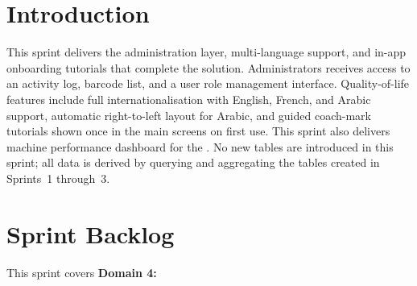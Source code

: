 \section*{Introduction}

This sprint delivers the administration layer, multi-language support, and
in-app onboarding tutorials that complete the  solution.
Administrators receives access to an activity log, barcode list, and a user role management
interface. Quality-of-life features include full internationalisation with English,
French, and Arabic support, automatic right-to-left layout for Arabic, and guided 
coach-mark tutorials shown once in the main screens on first use. This sprint also 
delivers machine performance dashboard for the . No new
 tables are introduced in this sprint; all data is
derived by querying and aggregating the tables created in Sprints~1 through~3.

\section{Sprint Backlog}

This sprint covers \textbf{Domain 4:}
\textbf{}

